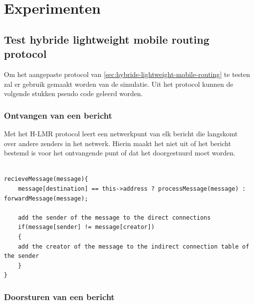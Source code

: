 \documentclass[a4paper, 11pt, oneside]{report}
\begin{document}
\chapter{Experimenten}
\label{experimenten}


\section{Test hybride lightweight mobile routing protocol}

Om het aangepaste protocol van \autoref{sec:hybride-lightweight-mobile-routing} te testen zal er gebruik gemaakt worden van de simulatie.
Uit het protocol kunnen de volgende stukken pseudo code geleerd worden.

\subsection{Ontvangen van een bericht}

Met het H-LMR protocol leert een netwerkpunt van elk bericht die langskomt over andere zenders in het netwerk.
Hierin maakt het niet uit of het bericht bestemd is voor het ontvangende punt of dat het doorgestuurd moet worden. 

\begin{lstlisting}

recieveMessage(message){
	message[destination] == this->address ? processMessage(message) : forwardMessage(message);
	
	add the sender of the message to the direct connections
	if(message[sender] != message[creator])
	{
	add the creator of the message to the indirect connection table of the sender
	}
}

\end{lstlisting}

\subsection{Doorsturen van een bericht}
\end{document}
